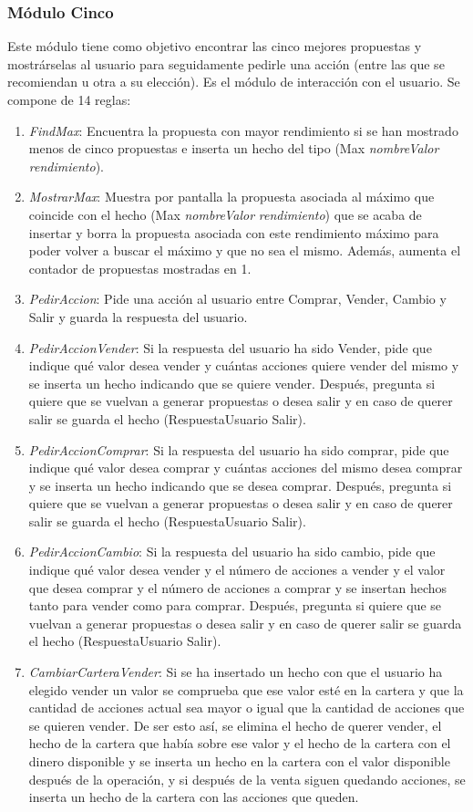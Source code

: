 \documentclass[12pt]{article}
\begin{document}
\subsubsection{Módulo Cinco}
Este módulo tiene como objetivo encontrar las cinco mejores propuestas y mostrárselas al usuario para seguidamente pedirle una acción (entre las que se recomiendan u otra a su elección). Es el módulo de interacción con el usuario. Se compone de 14 reglas:
\begin{enumerate}
\item \textit{FindMax}: Encuentra la propuesta con mayor rendimiento si se han mostrado menos de cinco propuestas e inserta un hecho del tipo (Max \textit{nombreValor} \textit{rendimiento}).
\item \textit{MostrarMax}: Muestra por pantalla la propuesta asociada al máximo que coincide con el hecho (Max \textit{nombreValor} \textit{rendimiento}) que se acaba de insertar y borra la propuesta asociada con este rendimiento máximo para poder volver a buscar el máximo y que no sea el mismo. Además, aumenta el contador de propuestas mostradas en 1.
\item \textit{PedirAccion}: Pide una acción al usuario entre Comprar, Vender, Cambio y Salir y guarda la respuesta del usuario.
\item \textit{PedirAccionVender}: Si la respuesta del usuario ha sido Vender, pide que indique qué valor desea vender y cuántas acciones quiere vender del mismo y se inserta un hecho indicando que se quiere vender. Después, pregunta si quiere que se vuelvan a generar propuestas o desea salir y en caso de querer salir se guarda el hecho (RespuestaUsuario Salir).
\item \textit{PedirAccionComprar}: Si la respuesta del usuario ha sido comprar, pide que indique qué valor desea comprar y cuántas acciones del mismo desea comprar y se inserta un hecho indicando que se desea comprar. Después, pregunta si quiere que se vuelvan a generar propuestas o desea salir y en caso de querer salir se guarda el hecho (RespuestaUsuario Salir).
\item \textit{PedirAccionCambio}: Si la respuesta del usuario ha sido cambio, pide que indique qué valor desea vender y el número de acciones a vender y el valor que desea comprar y el número de acciones a comprar y se insertan hechos tanto para vender como para comprar. Después, pregunta si quiere que se vuelvan a generar propuestas o desea salir y en caso de querer salir se guarda el hecho (RespuestaUsuario Salir).
\item \textit{CambiarCarteraVender}: Si se ha insertado un hecho con que el usuario ha elegido vender un valor se comprueba que ese valor esté en la cartera y que la cantidad de acciones actual sea mayor o igual que la cantidad de acciones que se quieren vender. De ser esto así, se elimina el hecho de querer vender, el hecho de la cartera que había sobre ese valor y el hecho de la cartera con el dinero disponible y se inserta un hecho en la cartera con el valor disponible después de la operación, y si después de la venta siguen quedando acciones, se inserta un hecho de la cartera con las acciones que queden.

\end{enumerate}
\end{document}
